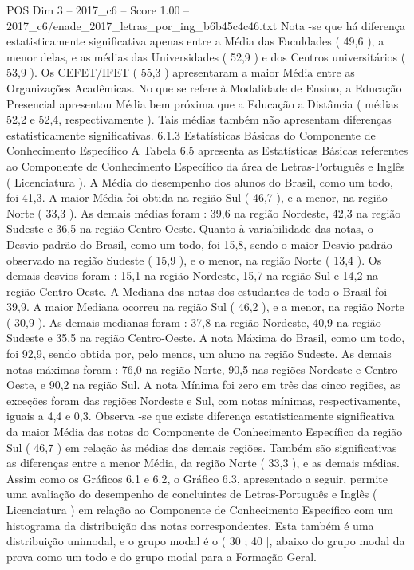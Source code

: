 \begin{textsample}{POS Dim 3 – 2017\_c6 – Score 1.00 – 2017\_c6/enade\_2017\_letras\_por\_ing\_b6b45c4c46.txt}
Nota -se que há diferença estatisticamente significativa apenas entre a Média das Faculdades ( 49,6 ), a menor delas, e as médias das Universidades ( 52,9 ) e dos Centros universitários ( 53,9 ).
Os CEFET/IFET ( 55,3 ) apresentaram a maior Média entre as Organizações Acadêmicas.
No que se refere à Modalidade de Ensino, a Educação Presencial apresentou Média bem próxima que a Educação a Distância ( médias 52,2 e 52,4, respectivamente ).
Tais médias também não apresentam diferenças estatisticamente significativas. 6.1.3 Estatísticas Básicas do Componente de Conhecimento Específico A Tabela 6.5 apresenta as Estatísticas Básicas referentes ao Componente de Conhecimento Específico da área de Letras-Português e Inglês ( Licenciatura ).
A Média do desempenho dos alunos do Brasil, como um todo, foi 41,3.
A maior Média foi obtida na região Sul ( 46,7 ), e a menor, na região Norte ( 33,3 ).
As demais médias foram : 39,6 na região Nordeste, 42,3 na região Sudeste e 36,5 na região Centro-Oeste.
Quanto à variabilidade das notas, o Desvio padrão do Brasil, como um todo, foi 15,8, sendo o maior Desvio padrão observado na região Sudeste ( 15,9 ), e o menor, na região Norte ( 13,4 ).
Os demais desvios foram : 15,1 na região Nordeste, 15,7 na região Sul e 14,2 na região Centro-Oeste.
A Mediana das notas dos estudantes de todo o Brasil foi 39,9.
A maior Mediana ocorreu na região Sul ( 46,2 ), e a menor, na região Norte ( 30,9 ).
As demais medianas foram : 37,8 na região Nordeste, 40,9 na região Sudeste e 35,5 na região Centro-Oeste.
A nota Máxima do Brasil, como um todo, foi 92,9, sendo obtida por, pelo menos, um aluno na região Sudeste.
As demais notas máximas foram : 76,0 na região Norte, 90,5 nas regiões Nordeste e Centro-Oeste, e 90,2 na região Sul.
A nota Mínima foi zero em três das cinco regiões, as exceções foram das regiões Nordeste e Sul, com notas mínimas, respectivamente, iguais a 4,4 e 0,3.
Observa -se que existe diferença estatisticamente significativa da maior Média das notas do Componente de Conhecimento Específico da região Sul ( 46,7 ) em relação às médias das demais regiões.
Também são significativas as diferenças entre a menor Média, da região Norte ( 33,3 ), e as demais médias.
Assim como os Gráficos 6.1 e 6.2, o Gráfico 6.3, apresentado a seguir, permite uma avaliação do desempenho de concluintes de Letras-Português e Inglês ( Licenciatura ) em relação ao Componente de Conhecimento Específico com um histograma da distribuição das notas correspondentes.
Esta também é uma distribuição unimodal, e o grupo modal é o ( 30 ; 40 ], abaixo do grupo modal da prova como um todo e do grupo modal para a Formação Geral.

\end{textsample}
